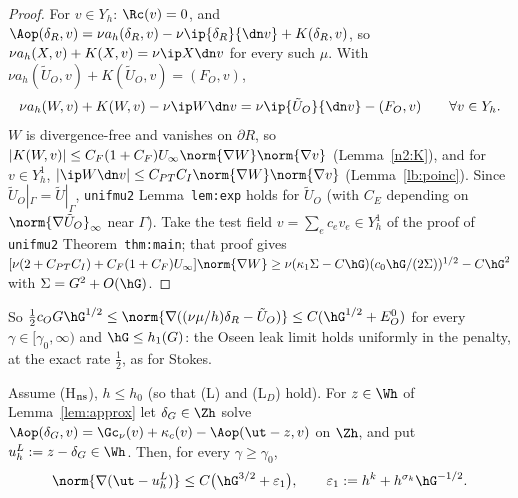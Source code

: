 \begin{proof}
For $v\in Y_h$: $\Rc(v)=0$, and $\Aop(\delta_R,v)=\nu a_h(\delta_R,v)-\nu\ip{\delta_R}{\dn v}+K(\delta_R,v)$, so
$\nu a_h(X,v)+K(X,v)=\nu\ip X{\dn v}$ for every such $\mu$. With $\nu a_h(\tilde U_O,v)+K(\tilde U_O,v)=(F_O,v)$,
\[
\nu a_h(W,v)+K(W,v)-\nu\ip W{\dn v}=\nu\ip{\tilde U_O}{\dn v}-(F_O,v)\qquad\forall v\in Y_h .
\]
$W$ is divergence-free and vanishes on $\partial R$, so $|K(W,v)|\le C_F(1+C_F)U_\infty\norm{\nabla W}\norm{\nabla v}$ (Lemma~\ref{n2:K}), and for $v\in Y_h^1$,
$|\ip W{\dn v}|\le C_{PT}C_I\norm{\nabla W}\norm{\nabla v}$ (Lemma~\ref{lb:poinc}). Since $\tilde U_O|_\Gamma=\tilde U|_\Gamma$, \texttt{unifmu2}
Lemma~\texttt{lem:exp} holds for $\tilde U_O$ (with $C_E$ depending on $\norm{\nabla\tilde U_O}_\infty$ near $\Gamma$). Take the test field
$v=\sum_ec_ev_e\in Y_h^1$ of the proof of \texttt{unifmu2} Theorem~\texttt{thm:main}; that proof gives
$[\nu(2+C_{PT}C_I)+C_F(1+C_F)U_\infty]\norm{\nabla W}\ge\nu(\kappa_1\Sigma-C\hG)(c_0\hG/(2\Sigma))^{1/2}-C\hG^2$ with $\Sigma=G^2+O(\hG)$.
\end{proof}

So $\frac12c_OG\hG^{1/2}\le\norm{\nabla((\nu\mu/h)\delta_R-\tilde U_O)}\le C(\hG^{1/2}+E^0_O)$ for every $\gamma\in[\gamma_0,\infty)$ and $\hG\le h_1(G)$: the
Oseen leak limit holds uniformly in the penalty, at the exact rate $\frac12$, as for Stokes.

\begin{lemma}\label{n2:lin}
Assume (H$_{\rm ns}$), $h\le h_0$ (so that (L) and (L$_D$) hold). For $z\in\Wh$ of Lemma~\ref{lem:approx} let $\delta_G\in\Zh$ solve
$\Aop(\delta_G,v)=\Gc_\nu(v)+\kappa_c(v)-\Aop(\ut-z,v)$ on $\Zh$, and put $u^L_h:=z-\delta_G\in\Wh$. Then, for every $\gamma\ge\gamma_0$,
\[
\norm{\nabla(\ut-u^L_h)}\le C\bigl(\hG^{3/2}+\varepsilon_1\bigr),\qquad \varepsilon_1:=h^k+h^{\sigma_k}\hG^{-1/2}.
\]
\end{lemma}

